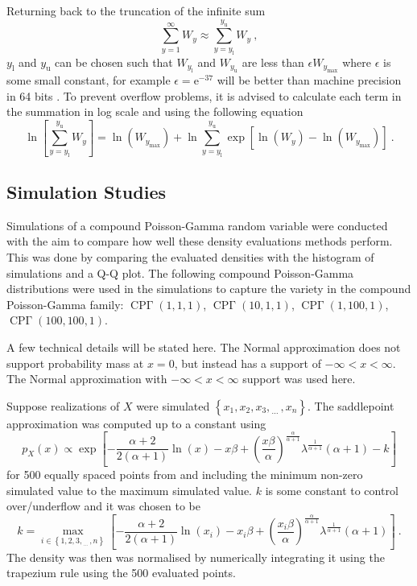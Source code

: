 \documentclass[12pt, a4paper]{memoir}
\DeclareMathOperator{\CPoisson}{CP\Gamma}
\newcommand{\euler}{\mathrm{e}}
\newcommand{\dotdotdot}{_{\phantom{.}\cdots}}
\begin{document}
Returning back to the truncation of the infinite sum
\begin{equation}
\sum_{y=1}^\infty W_y \approx \sum_{y=y_\text{l}}^{y_\text{u}}W_y \ ,
\end{equation}
$y_\text{l}$ and $y_\text{u}$ can be chosen such that $W_{y_\text{l}}$ and $W_{y_\text{u}}$ are less than $\epsilon W_{y_\text{max}}$ where $\epsilon$ is some small constant, for example $\epsilon=\euler^{-37}$ will be better than machine precision in 64 bits \citep{dunn2005series}. To prevent overflow problems, it is advised to calculate each term in the summation in log scale \citep{dunn2005series} and using the following equation
\begin{equation}
\ln\left[\sum_{y=y_\text{l}}^{y_\text{u}}W_y\right]
= \ln\left(W_{y_\text{max}}\right)+\ln\sum_{y=y_\text{l}}^{y_\text{u}}\exp\left[
\ln\left(W_y\right)-\ln\left(W_{y_\text{max}}\right)
\right] \ .
\end{equation}

\subsection{Simulation Studies}

Simulations of a compound Poisson-Gamma random variable were conducted with the aim to compare how well these density evaluations methods perform. This was done by comparing the evaluated densities with the histogram of simulations and a Q-Q plot. The following compound Poisson-Gamma distributions were used in the simulations to capture the variety in the compound Poisson-Gamma family: $\CPoisson(1,1,1)$, $\CPoisson(10,1,1)$, $\CPoisson(1,100,1)$, $\CPoisson(100,100,1)$.

A few technical details will be stated here. The Normal approximation does not support probability mass at $x=0$, but instead has a support of $-\infty<x<\infty$. The Normal approximation with $-\infty<x<\infty$ support was used here.

Suppose realizations of $X$ were simulated $\left\{x_1,x_2,x_3,\dotdotdot,x_n\right\}$. The saddlepoint approximation was computed up to a constant using
\begin{equation}
p_X(x) \propto \exp\left[
-\frac{\alpha+2}{2(\alpha+1)}\ln(x)
-x\beta
+\left(
\frac{x\beta}{\alpha}
\right)^{\frac{\alpha}{\alpha+1}}\lambda^{\frac{1}{\alpha+1}}(\alpha+1) - k
\right]
\end{equation}
for 500 equally spaced points from and including the minimum non-zero simulated value to the maximum simulated value. $k$ is some constant to control over/underflow and it was chosen to be
\begin{equation}
k = \max_{i\in\left\{1,2,3,\dotdotdot,n\right\}}\left[
-\frac{\alpha+2}{2(\alpha+1)}\ln(x_i)
-x_i\beta
+\left(
\frac{x_i\beta}{\alpha}
\right)^{\frac{\alpha}{\alpha+1}}\lambda^{\frac{1}{\alpha+1}}(\alpha+1)
\right] \ .
\end{equation}
The density was then was normalised by numerically integrating it using the trapezium rule using the 500 evaluated points.
\end{document}
